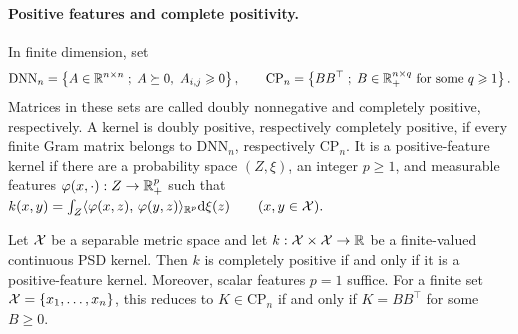\paragraph{Positive features and complete positivity.}
\begin{defn}\label{def-dnn-cp-kernels}
In finite dimension, set
\[
\mathrm{DNN}_n=\left\{ A\in\mathbb{R}^{n\times n} \;;\; A\succeq0,\ A_{i,j}\geqslant0 \right\},
\qquad
\mathrm{CP}_n=\left\{ BB^\top \;;\; B\in\mathbb{R}_+^{n\times q}\hbox{ for some }q\geqslant1 \right\}.
\]
Matrices in these sets are called doubly nonnegative and completely positive, respectively. A kernel is doubly positive, respectively completely positive, if every finite Gram matrix belongs to \(\mathrm{DNN}_n\), respectively \(\mathrm{CP}_n\).
It is a positive-feature kernel if there are a probability space \((Z,\xi)\), an integer \(p\geq1\), and measurable features \(\varphi(x,\cdot):Z\to\mathbb{R}_+^p\) such that
\(k(x,y)=\int_Z\langle \varphi(x,z),\,\varphi(y,z)\rangle_{\mathbb{R}^p}\mathrm{d}\xi(z) \qquad (x,y\in\mathcal{X}).\)
\end{defn}
\begin{prop}
\label{prop-cp-kernel-positive-features}
Let \(\mathcal{X}\) be a separable metric space and let \(k:\mathcal{X}\times\mathcal{X}\to\mathbb{R}\) be a finite-valued continuous PSD kernel. Then \(k\) is completely positive if and only if it is a positive-feature kernel. Moreover, scalar features \(p=1\) suffice. For a finite set \(\mathcal{X}=\{x_1,\ldots,x_n\}\), this reduces to \(K\in\mathrm{CP}_n\) if and only if \(K=BB^\top\) for some \(B\geq0\).
\end{prop}

